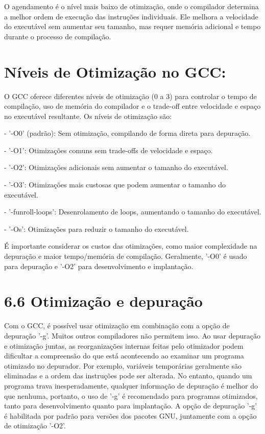 O agendamento é o nível mais baixo de otimização, onde o compilador determina a melhor ordem de execução das instruções individuais. Ele melhora a velocidade do executável sem aumentar seu tamanho, mas requer memória adicional e tempo durante o processo de compilação.


\section{Níveis de Otimização no GCC:}

O GCC oferece diferentes níveis de otimização (0 a 3) para controlar o tempo de compilação, uso de memória do compilador e o trade-off entre velocidade e espaço no executável resultante. Os níveis de otimização são:

- '-O0' (padrão): Sem otimização, compilando de forma direta para depuração.

- '-O1': Otimizações comuns sem trade-offs de velocidade e espaço.

- '-O2': Otimizações adicionais sem aumentar o tamanho do executável.

- '-O3': Otimizações mais custosas que podem aumentar o tamanho do executável.

- '-funroll-loops': Desenrolamento de loops, aumentando o tamanho do executável.

- '-Os': Otimizações para reduzir o tamanho do executável.

É importante considerar os custos das otimizações, como maior complexidade na depuração e maior tempo/memória de compilação. Geralmente, '-O0' é usado para depuração e '-O2' para desenvolvimento e implantação.

\section{6.6 Otimização e depuração}

Com o GCC, é possível usar otimização em combinação com a opção de depuração '-g'. Muitos outros compiladores não permitem isso.
Ao usar depuração e otimização juntas, as reorganizações internas feitas pelo otimizador podem dificultar a compreensão do que está acontecendo ao examinar um programa otimizado no depurador. Por exemplo, variáveis temporárias geralmente são eliminadas e a ordem das instruções pode ser alterada.
No entanto, quando um programa trava inesperadamente, qualquer informação de depuração é melhor do que nenhuma, portanto, o uso de '-g' é recomendado para programas otimizados, tanto para desenvolvimento quanto para implantação. A opção de depuração '-g' é habilitada por padrão para versões dos pacotes GNU, juntamente com a opção de otimização '-O2'.

